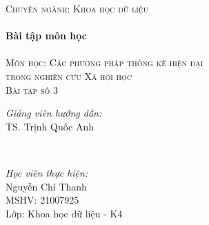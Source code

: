 \documentclass[14pt, a4paper]{article}
\theoremstyle{sltheorem}
\theoremstyle{soltheorem}
\begin{document}
\begin{titlepage}
    \textsc{\Large Chuyên ngành: Khoa học dữ liệu}\\[0.5cm] %



    \HRule \\[0.4cm]
    { \huge \bfseries Bài tập môn học}\\[0.4cm] %
    \HRule \\[1.5cm]

    \textsc{\Large Môn học: Các phương pháp thống kê hiện đại \\ trong nghiên cứu Xã hội học}\\[1cm] %


    \textsc{\Large Bài tập số 3}\\[1cm]


    \begin{minipage}{0.4\textwidth}
        \begin{flushleft} \large
        \emph{Giảng viên hướng dẫn:} \\
        TS. Trịnh Quốc Anh %
        \end{flushleft}
    \end{minipage}\\[0.5cm]

    \begin{minipage}{0.4\textwidth}
    \begin{flushleft} \large
    \emph{Học viên thực hiện:}\\
    Nguyễn Chí Thanh \\
    MSHV: 21007925 \\ %
    Lớp: Khoa học dữ liệu - K4
    \end{flushleft}
    \end{minipage}




\end{titlepage}
\end{document}
